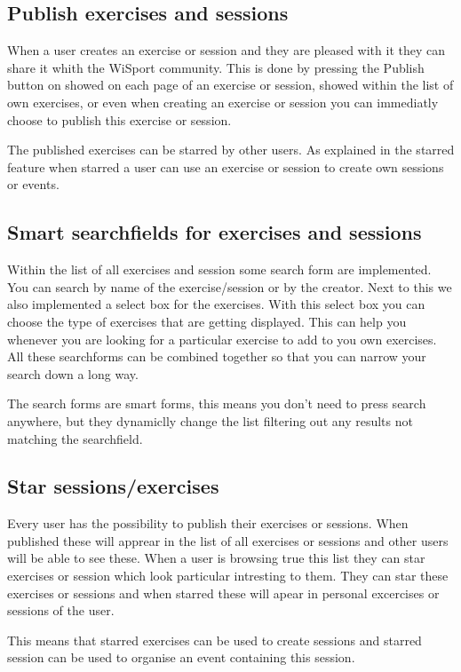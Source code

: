 \documentclass[11pt,a4paper]{scrartcl}
\begin{document}
\subsection{Publish exercises and sessions}
When a user creates an exercise or session and they are pleased with it they can share it whith the WiSport community. This is done by
pressing the Publish button on showed on each page of an exercise or session, showed within the list of own exercises, or even when 
creating an exercise or session you can immediatly choose to publish this exercise or session.

The published exercises can be starred by other users. As explained in the starred feature when starred a user can use an exercise
or session to create own sessions or events.
\subsection{Smart searchfields for exercises and sessions}
Within the list of all exercises and session some search form are implemented. You can search by name of the exercise/session or by
the creator. Next to this we also implemented a select box for the exercises. With this select box you can choose the type of exercises
that are getting displayed. This can help you whenever you are looking for a particular exercise to add to you own exercises. All these
searchforms can be combined together so that you can narrow your search down a long way.

The search forms are smart forms, this means you don't need to press search anywhere, but they dynamiclly change the list filtering out 
any results not matching the searchfield.

\subsection{Star sessions/exercises}
Every user has the possibility to publish their exercises or sessions. When published
these will apprear in the list of all exercises or sessions and other users will be able to
see these. When a user is browsing true this list they can star exercises or session which
look particular intresting to them. They can star these exercises or sessions and when
starred these will apear in personal excercises or sessions of the user.

This means that starred exercises can be used to create sessions and starred session can
be used to organise an event containing this session.
\end{document}

